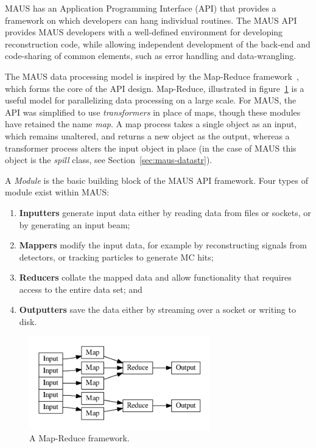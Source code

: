 \documentclass{JINST}
\begin{document}
MAUS has an Application Programming Interface (API) that provides a framework on which developers can hang individual routines. The MAUS API provides MAUS developers with a well-defined environment for developing reconstruction code, while allowing independent development of the back-end and code-sharing of common elements, such as error handling and data-wrangling. 

The MAUS data processing model is inspired by the Map-Reduce framework~\cite{MapReduce}, which forms the core of the API design. Map-Reduce, illustrated in figure~\ref{fig:mapreduce} is a useful model for parallelizing data processing on a large scale. For MAUS, the API was simplified to use \emph{transformers} in place of maps, though these modules have retained the name \emph{map}. A map process takes a single object as an input, which remains unaltered, and returns a new object as the output, whereas a transformer process alters the input object in place (in the case of MAUS this object is the \emph{spill} class, see Section~\ref{sec:maus-datastr}).

A \emph{Module} is the basic building block of the MAUS API framework. Four types of module exist within MAUS:

\begin{enumerate}
\item \textbf{Inputters} generate input data either by reading data from files or sockets, or by generating an input beam;
\item \textbf{Mappers} modify the input data, for example by reconstructing signals from detectors, or tracking  particles to generate MC hits;
\item \textbf{Reducers} collate the mapped data and allow functionality that requires access to the entire data set; and
\item \textbf{Outputters} save the data  either by streaming over a socket or writing to disk.
\end{enumerate}

\begin{figure}[!htb]
\centering
\includegraphics[width=0.7\textwidth]{figs/map_reduce.pdf}
\caption{A Map-Reduce framework.}
\label{fig:mapreduce}
\end{figure}
\end{document}
